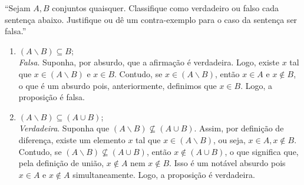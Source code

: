\enquote{Sejam $A, B$ conjuntos quaisquer. Classifique como verdadeiro ou falso cada sentença abaixo. Justifique ou dê um contra-exemplo para o caso da sentença ser falsa.}
    \begin{enumerate}
        \item $(A \backslash B) \subseteq B$; \\
        \emph{Falsa}. Suponha, por absurdo, que a afirmação é verdadeira. Logo, existe $x$ tal que $x \in (A \backslash B)$ e $x \in B$. Contudo, se $x \in (A \backslash B)$, então $x \in A$ e $x \notin B$, o que é um absurdo pois, anteriormente, definimos que $x \in B$. Logo, a proposição é falsa.
        \item $(A \backslash B) \subseteq (A \cup B)$; \\
        \emph{Verdadeira}. 
        Suponha que $(A \backslash B) \nsubseteq (A \cup B)$. Assim, por definição de diferença, existe um elemento $x$ tal que $x \in (A \backslash B)$, ou seja, $x \in A, x \notin B$. Contudo, se $(A \backslash B) \nsubseteq (A \cup B)$, então $x \notin (A \cup B)$, o que significa que, pela definição de união, $x \notin A \text{ nem } x \notin B$. Isso é um notável absurdo pois $x \in A$ e $x \notin A$ simultaneamente. Logo, a proposição é verdadeira.
    \end{enumerate}